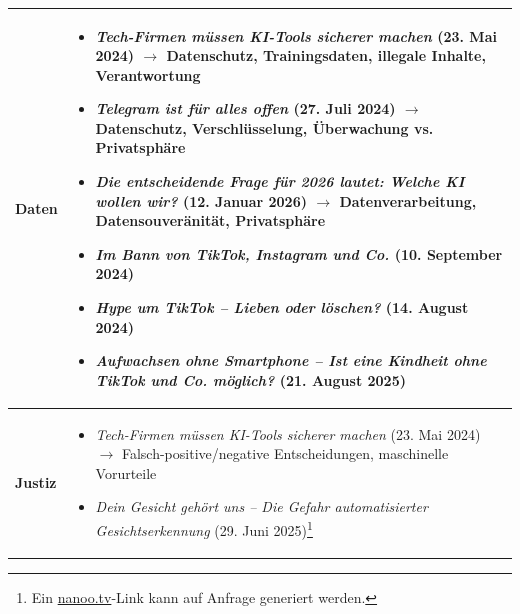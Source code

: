 \begin{longtable}{@{}lp{14cm}@{}}
	\textbf{Daten} &
	\begin{itemize}[leftmargin=*,noitemsep,topsep=0pt]
		\item[\faFilePdf{}] \textit{Tech-Firmen müssen KI-Tools sicherer machen} (23. Mai 2024) \newline
		$\rightarrow$ Datenschutz, Trainingsdaten, illegale Inhalte, Verantwortung
		\item[\faFilePdf{}] \textit{Telegram ist für alles offen} (27. Juli 2024) \newline
		$\rightarrow$ Datenschutz, Verschlüsselung, Überwachung vs. Privatsphäre
		\item[\faFilePdf{}] \textit{Die entscheidende Frage für 2026 lautet: Welche KI wollen wir?} (12. Januar 2026) \newline
		$\rightarrow$ Datenverarbeitung, Datensouveränität, Privatsphäre
		\item[\faPlayCircle{}] \textit{Im Bann von TikTok, Instagram und Co.} (10. September 2024) \href{https://www.srf.ch/play/tv/kassensturz/video/im-bann-von-tiktok-instagram-und-co-?urn=urn:srf:video:3cdc375c-5f1d-4029-bda4-9690c27c9c0e}{\faLink}
		\item[\faPlayCircle{}] \textit{Hype um TikTok -- Lieben oder löschen?} (14. August 2024) \href{https://www.srf.ch/play/tv/dok/video/hype-um-tiktok---lieben-oder-loeschen?urn=urn:srf:video:6b2838d3-7f05-4dc3-897d-dfc68b7430c7}{\faLink}
		\item[\faPlayCircle{}] \textit{Aufwachsen ohne Smartphone -- Ist eine Kindheit ohne TikTok und Co. möglich?} (21. August 2025) \href{https://www.srf.ch/play/tv/nzz-format/video/aufwachsen-ohne-smartphone---ist-eine-kindheit-ohne-tiktok-und-co--moeglich?urn=urn:srf:video:0fb13fb2-cc18-448f-9a5f-2ff411c16877}{\faLink}
	\end{itemize} \\
	\midrule

	\textbf{Justiz} &
	\begin{itemize}[leftmargin=*,noitemsep,topsep=0pt]
		\item[\faFilePdf{}] \textit{Tech-Firmen müssen KI-Tools sicherer machen} (23. Mai 2024) \newline
				$\rightarrow$ Falsch-positive/negative Entscheidungen, maschinelle Vorurteile
				\item[\faPlayCircle{}] \textit{Dein Gesicht gehört uns -- Die Gefahr automatisierter Gesichtserkennung} (29. Juni 2025)\footnote{Ein \url{nanoo.tv}-Link kann auf Anfrage generiert werden.}
	\end{itemize} \\
	\midrule


\end{longtable}
